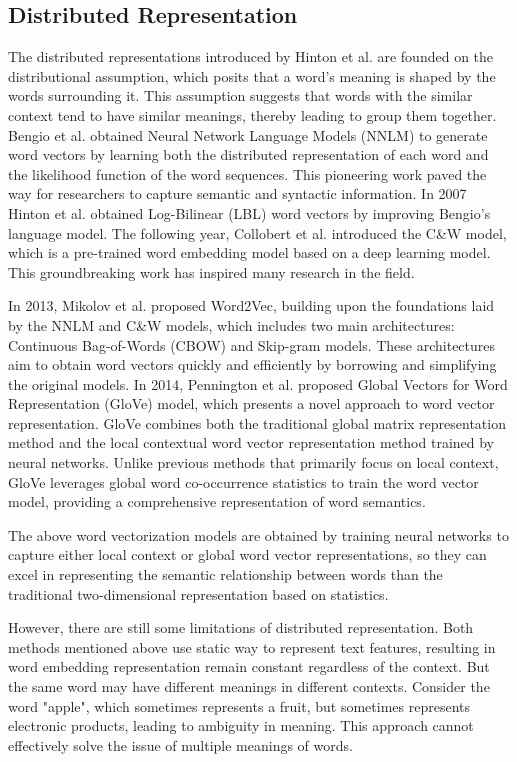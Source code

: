 \documentclass[ %
                    author={Louis Wang},
                supervisor={Dr. Qiang Liu},
                    degree={MSc},
                     title={Identification of Suicide Ideation in Texts},
                      type={},
                      year={2024}]{dissertation}
\begin{document}
\subsection{Distributed Representation}
\noindent
The distributed representations introduced by Hinton et al.\cite{hinton1986learning} are founded on the distributional assumption, which posits that a word's meaning is shaped by the words surrounding it. This assumption suggests that words with the similar context tend to have similar meanings, thereby leading to group them together. Bengio et al. obtained Neural Network Language Models (NNLM) to generate word vectors by learning both the distributed representation of each word and the likelihood function of the word sequences.\cite{bengio2000neural} This pioneering work paved the way for researchers to capture semantic and syntactic information. In 2007 Hinton et al. obtained Log-Bilinear (LBL) word vectors by improving Bengio's language model.\cite{mnih2007three} The following year, Collobert et al. introduced the C\&W model\cite{collobert2008unified}, which is a pre-trained word embedding model based on a deep learning model. This groundbreaking work has inspired many research in the field.

In 2013, Mikolov et al. proposed Word2Vec\cite{mikolov2013efficient}, building upon the foundations laid by the NNLM and C\&W models, which includes two main architectures: Continuous Bag-of-Words (CBOW) and Skip-gram models. These architectures aim to obtain word vectors quickly and efficiently by borrowing and simplifying the original models. In 2014, Pennington et al. proposed Global Vectors for Word Representation (GloVe) model\cite{pennington2014glove}, which presents a novel approach to word vector representation. GloVe combines both the traditional global matrix representation method and the local contextual word vector representation method trained by neural networks. Unlike previous methods that primarily focus on local context, GloVe leverages global word co-occurrence statistics to train the word vector model, providing a comprehensive representation of word semantics.

The above word vectorization models are obtained by training neural networks to capture either local context or global word vector representations, so they can excel in representing the semantic relationship between words than the traditional two-dimensional representation based on statistics. 

However, there are still some limitations of distributed representation. Both methods mentioned above use static way to represent text features, resulting in word embedding representation remain constant regardless of the context. But the same word may have different meanings in different contexts. Consider the word "apple", which sometimes represents a fruit, but sometimes represents electronic products, leading to ambiguity in meaning. This approach cannot effectively solve the issue of multiple meanings of words.
\end{document}

